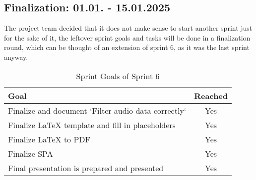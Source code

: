 \subsection{Finalization: 01.01. - 15.01.2025}\label{subsec:sprint-finalization}
The project team decided that it does not make sense to start another sprint just for the sake of it, the leftover
sprint goals and tasks will be done in a finalization round, which can be thought of an extension of sprint 6,
as it was the last sprint anyway.
\begin{table}[H]
    \centering
    \begin{tabularx}{\textwidth}{X c}
        \toprule
        \textbf{Goal}                                         & \textbf{Reached} \\
        \midrule
        Finalize and document `Filter audio data correctly`   & Yes              \\
        \midrule
        Finalize LaTeX template and fill in placeholders      & Yes              \\
        \midrule
        Finalize LaTeX to PDF                                 & Yes              \\
        \midrule
        Finalize SPA                                          & Yes              \\
        \midrule
        Final presentation is prepared and presented          & Yes              \\
        \bottomrule
    \end{tabularx}
    \caption{Sprint Goals of Sprint 6}\label{tab:sprint-finalization}
\end{table}